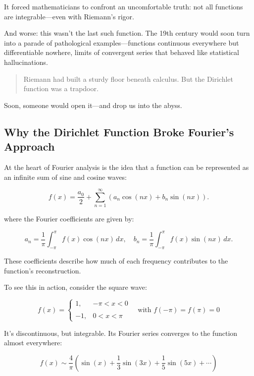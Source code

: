 It forced mathematicians to confront an uncomfortable truth:  
not all functions are integrable—even with Riemann’s rigor.

\medskip

And worse: this wasn't the last such function. The 19th century would soon turn into a parade of pathological examples—functions continuous everywhere but differentiable nowhere, limits of convergent series that behaved like statistical hallucinations.

\begin{quote}
Riemann had built a sturdy floor beneath calculus.  
But the Dirichlet function was a trapdoor.
\end{quote}

Soon, someone would open it—and drop us into the abyss.




\subsection{Why the Dirichlet Function Broke Fourier's Approach}

At the heart of Fourier analysis is the idea that a function can be represented as an infinite sum of sine and cosine waves:

\[
f(x) = \frac{a_0}{2} + \sum_{n=1}^{\infty} \left( a_n \cos(nx) + b_n \sin(nx) \right).
\]

where the Fourier coefficients are given by:

\[
a_n = \frac{1}{\pi} \int_{-\pi}^{\pi} f(x) \cos(n x) \,dx, \quad
b_n = \frac{1}{\pi} \int_{-\pi}^{\pi} f(x) \sin(n x) \,dx.
\]

These coefficients describe how much of each frequency contributes to the function’s reconstruction.

To see this in action, consider the square wave:

\[
f(x) = 
\begin{cases}
1, & -\pi < x < 0 \\\\
-1, & 0 < x < \pi
\end{cases}
\quad \text{with } f(-\pi) = f(\pi) = 0
\]

It’s discontinuous, but integrable. Its Fourier series converges to the function almost everywhere:

\[
f(x) \sim \frac{4}{\pi} \left( \sin(x) + \frac{1}{3} \sin(3x) + \frac{1}{5} \sin(5x) + \cdots \right)
\]

